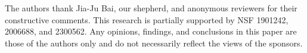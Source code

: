 \begin{acks}
The authors thank Jia-Ju Bai, our shepherd, and anonymous reviewers for their constructive comments. This research is partially 
supported by NSF 1901242, 2006688, and 2300562.
Any opinions, findings, and conclusions in this paper are those of the authors 
only and do not necessarily reflect the views of the sponsors.
\end{acks}

